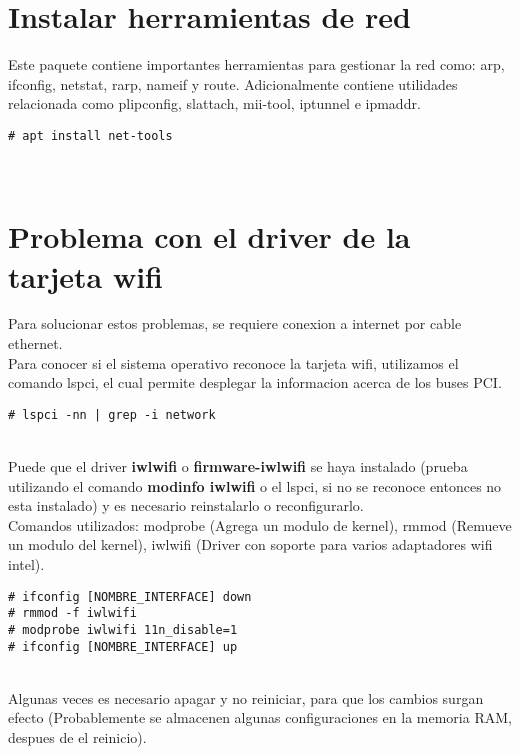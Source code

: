 \section{Instalar herramientas de red}
Este paquete contiene importantes herramientas para gestionar la red como: arp, ifconfig, netstat, rarp, nameif y route. Adicionalmente contiene utilidades relacionada como plipconfig, slattach, mii-tool, iptunnel e ipmaddr.
\begin{verbatim}
# apt install net-tools
\end{verbatim}
\\[1em]

\section{Problema con el driver de la tarjeta wifi}
Para solucionar estos problemas, se requiere conexion a internet por cable ethernet.\\
Para conocer si el sistema operativo reconoce la tarjeta wifi, utilizamos el comando lspci, el cual permite desplegar la informacion acerca de los buses PCI.
\begin{verbatim}
# lspci -nn | grep -i network
\end{verbatim}
\\[1em]
Puede que el driver \textbf{iwlwifi} o \textbf{firmware-iwlwifi} se haya instalado (prueba utilizando el comando \textbf{modinfo iwlwifi} o el lspci, si no se reconoce entonces no esta instalado) y es necesario reinstalarlo o reconfigurarlo.\\
Comandos utilizados: modprobe (Agrega un modulo de kernel), rmmod (Remueve un modulo del kernel), iwlwifi (Driver con soporte para varios adaptadores wifi intel).
\begin{verbatim}
# ifconfig [NOMBRE_INTERFACE] down
# rmmod -f iwlwifi
# modprobe iwlwifi 11n_disable=1
# ifconfig [NOMBRE_INTERFACE] up
\end{verbatim}
\\[1em]
Algunas veces es necesario apagar y no reiniciar, para que los cambios surgan efecto (Probablemente se almacenen algunas configuraciones en la memoria RAM, despues de el reinicio).\\

